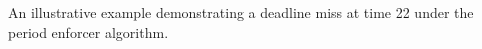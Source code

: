 An illustrative example demonstrating a deadline miss at time 22
under the period enforcer algorithm.
\label{fig:example}
  
